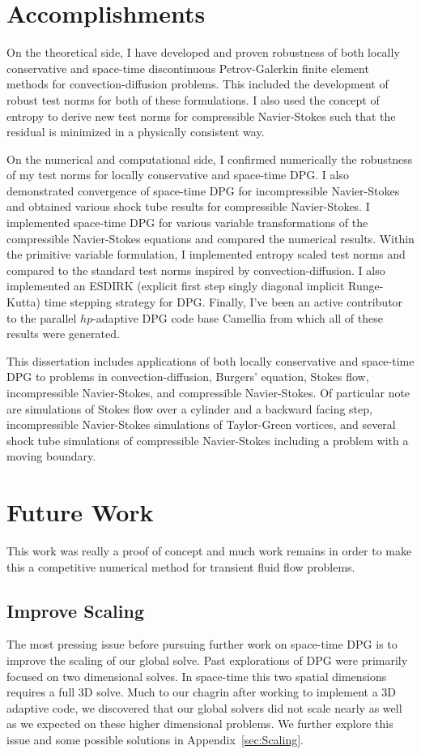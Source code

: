 \documentclass[Dissertation.tex]{subfiles}
\begin{document}
\section{Accomplishments}
On the theoretical side, I have developed and proven robustness of both locally conservative and space-time
discontinuous Petrov-Galerkin finite element methods for convection-diffusion problems.
This included the development of robust test norms for both of these formulations.
I also used the concept of entropy to derive new test norms for compressible Navier-Stokes
such that the residual is minimized in a physically consistent way.

On the numerical and computational side, I confirmed numerically the robustness of my test norms for
locally conservative and space-time DPG.
I also demonstrated convergence of space-time DPG for incompressible Navier-Stokes and 
obtained various shock tube results for compressible Navier-Stokes.
I implemented space-time DPG for various variable transformations of the compressible Navier-Stokes
equations and compared the numerical results.
Within the primitive variable formulation, I implemented entropy scaled test norms and 
compared to the standard test norms inspired by convection-diffusion.
I also implemented an ESDIRK (explicit first step singly diagonal implicit Runge-Kutta) time stepping
strategy for DPG.
Finally, I've been an active contributor to the parallel $hp$-adaptive DPG code base Camellia\cite{CamelliaDPG}
from which all of these results were generated.

This dissertation includes applications of both locally conservative and space-time DPG to problems
in convection-diffusion, Burgers' equation, Stokes flow, incompressible Navier-Stokes,
and compressible Navier-Stokes.
Of particular note are simulations of Stokes flow over a cylinder and a backward facing step,
incompressible Navier-Stokes simulations of Taylor-Green vortices, and several shock tube simulations
of compressible Navier-Stokes including a problem with a moving boundary.

\section{Future Work}
This work was really a proof of concept and much work remains in order to make this a competitive numerical method
for transient fluid flow problems.

\subsection{Improve Scaling}
The most pressing issue before pursuing further work on space-time DPG is to improve the scaling
of our global solve.
Past explorations of DPG were primarily focused on two dimensional solves.
In space-time this two spatial dimensions requires a full 3D solve.
Much to our chagrin after working to implement a 3D adaptive code, we discovered that 
our global solvers did not scale nearly as well as we expected on these higher dimensional problems.
We further explore this issue and some possible solutions in Appendix~\ref{sec:Scaling}.
\end{document}

